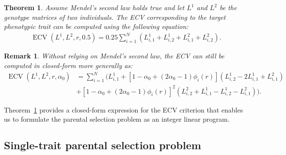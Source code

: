 \documentclass[12pt, a4paper, bibliography=totoc]{scrartcl}
\newtheorem{theorem}{Theorem}
\newtheorem{remark}{Remark}
\newcommand{\charles}[1]{{\color{green} #1}}
\newcommand{\bb}[1]{{\color{purple} #1}}
\DeclareMathOperator*{\ECV}{ECV}
\begin{document}
\begin{theorem}\label{thm.ecv}
Assume Mendel's second law holds true and let $L^1$ and $L^2$ be the genotype matrices of two individuals. The ECV corresponding to the target phenotypic trait can be computed using the following equation:
\begin{align} \label{eq:ecv_formula}
    \ECV(L^1,L^{2},r,0.5)=0.25\sum_{i=1}^{N} (L^{1}_{i,1}+L^{1}_{i,2}+L^{2}_{i,1}+L^{2}_{i,2}).
\end{align}
\end{theorem}
 

\begin{remark}
 Without relying on Mendel's second law, the ECV can still be computed in closed-form more generally as:
 \begin{align*} \ECV(L^1,L^2,r,\alpha_0)&=\sum_{i=1}^{N} \bigg(L^{1}_{i,1}+[1-\alpha_0+(2\alpha_0-1)\phi_i(r)](L^{1}_{i,2}-2L^{1}_{i,1}+L^{2}_{i,1})\\
    &+[1-\alpha_0+(2\alpha_0-1)\phi_i(r)]^2(L^{2}_{i,2}+L^{1}_{i,1}-L^{1}_{i,2}-L^{2}_{i,1})\bigg). 
\end{align*}
\end{remark}


Theorem~\ref{thm.ecv} provides a closed-form expression for the ECV criterion that enables us to formulate the parental selection problem as an integer linear program.

\subsection*{Single-trait parental selection problem}\label{subsec:math_formulation}
\end{document}
